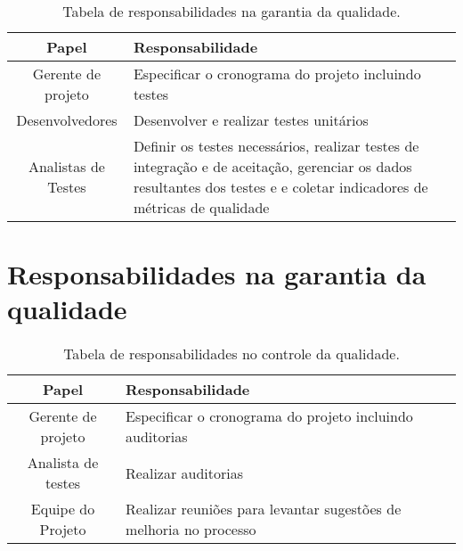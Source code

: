 
\begin{table}[H]
	\begin{tabularx}{\textwidth}{| c | X |}
		\hline
		\textbf{Papel}      & \textbf{Responsabilidade}                                                                                                                                    \\
		\hline
		Gerente de projeto  & Especificar o cronograma do projeto incluindo testes                                                                                                         \\
		\hline
		Desenvolvedores     & Desenvolver e realizar testes unitários                                                                                                                     \\
		\hline
		Analistas de Testes & Definir os testes necessários, realizar testes de integração e de aceitação, gerenciar os dados resultantes dos testes e e coletar indicadores de métricas de qualidade \\
		\hline
	\end{tabularx}
	\centering
	\caption{Tabela de responsabilidades na garantia da qualidade.}
	\label{tab:responsability-quality-guarantee}
\end{table}

\section{Responsabilidades na garantia da qualidade}


\begin{table}[H]
	\begin{tabularx}{\textwidth}{| c | X |}
		\hline
		\textbf{Papel}     & \textbf{Responsabilidade}                                           \\
		\hline
		Gerente de projeto & Especificar o cronograma do projeto incluindo auditorias            \\
		\hline
		Analista de testes & Realizar auditorias                                                 \\
		\hline
		Equipe do Projeto  & Realizar reuniões para levantar sugestões de melhoria no processo \\
		\hline
	\end{tabularx}
	\centering
	\caption{Tabela de responsabilidades no controle da qualidade.}
	\label{tab:responsability-quality-control}
\end{table}

